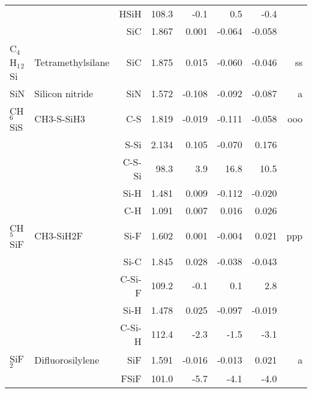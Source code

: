 \begin{table}
\begin{center}
\begin{tabular}{llrrrrrr}
             &                                    &HSiH         &     108.3   &      -0.1 &       0.5 &      -0.4   &       \\
             &                                    &SiC            &     1.867   &     0.001 &    -0.064 &    -0.058 &       \\
 C$_4$H$_1$$_2$Si     & Tetramethylsilane                  &SiC            &     1.875   &     0.015 &    -0.060 &    -0.046 &    ss \\
 SiN         & Silicon nitride                    &SiN            &     1.572   &    -0.108 &    -0.092 &    -0.087 &     a \\
 CH$_6$SiS      & CH3-S-SiH3                         &C-S            &     1.819   &    -0.019 &    -0.111 &    -0.058 &   ooo \\
             &                                    &S-Si           &     2.134   &     0.105 &    -0.070 &     0.176 &       \\
             &                                    &C-S-Si       &      98.3   &       3.9 &      16.8 &      10.5   &       \\
             &                                    &Si-H           &     1.481   &     0.009 &    -0.112 &    -0.020 &       \\
             &                                    &C-H            &     1.091   &     0.007 &     0.016 &     0.026 &       \\
 CH$_5$SiF      & CH3-SiH2F                          &Si-F           &     1.602   &     0.001 &    -0.004 &     0.021 &   ppp \\
             &                                    &Si-C           &     1.845   &     0.028 &    -0.038 &    -0.043 &       \\
             &                                    &C-Si-F       &     109.2   &      -0.1 &       0.1 &       2.8   &       \\
             &                                    &Si-H           &     1.478   &     0.025 &    -0.097 &    -0.019 &       \\
             &                                    &C-Si-H       &     112.4   &      -2.3 &      -1.5 &      -3.1   &       \\
 SiF$_2$        & Difluorosilylene                   &SiF            &     1.591   &    -0.016 &    -0.013 &     0.021 &     a \\
             &                                    &FSiF         &     101.0   &      -5.7 &      -4.1 &      -4.0   &       \\
\hline
\end{tabular}
\end{center}
\end{table}
\clearpage

